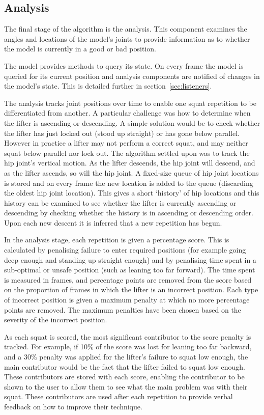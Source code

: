 \subsection{Analysis}

The final stage of the algorithm is the analysis. This component examines the angles and locations of the model's joints to provide information as to whether the model is currently in a good or bad position.

The model provides methods to query its state. On every frame the model is queried for its current position and analysis components are notified of changes in the model's state. This is detailed further in section~\ref{sec:listeners}.

The analysis tracks joint positions over time to enable one squat repetition to be differentiated from another. A particular challenge was how to determine when the lifter is ascending or descending. A simple solution would be to check whether the lifter has just locked out (stood up straight) or has gone below parallel. However in practice a lifter may not perform a correct squat, and may neither squat below parallel nor lock out. The algorithm settled upon was to track the hip joint's vertical motion. As the lifter descends, the hip joint will descend, and as the lifter ascends, so will the hip joint. A fixed-size queue of hip joint locations is stored and on every frame the new location is added to the queue (discarding the oldest hip joint location). This gives a short `history' of hip locations and this history can be examined to see whether the lifter is currently ascending or descending by checking whether the history is in ascending or descending order. Upon each new descent it is inferred that a new repetition has begun.

In the analysis stage, each repetition is given a percentage score. This is calculated by penalising failure to enter required positions (for example going deep enough and standing up straight enough) and by penalising time spent in a sub-optimal or unsafe position (such as leaning too far forward). The time spent is measured in frames, and percentage points are removed from the score based on the proportion of frames in which the lifter is an incorrect position. Each type of incorrect position is given a maximum penalty at which no more percentage points are removed. The maximum penalties have been chosen based on the severity of the incorrect position.

As each squat is scored, the most significant contributor to the score penalty is tracked. For example, if 10\% of the score was lost for leaning too far backward, and a 30\% penalty was applied for the lifter's failure to squat low enough, the main contributor would be the fact that the lifter failed to squat low enough. These contributors are stored with each score, enabling the contributor to be shown to the user to allow them to see what the main problem was with their squat. These contributors are used after each repetition to provide verbal feedback on how to improve their technique.